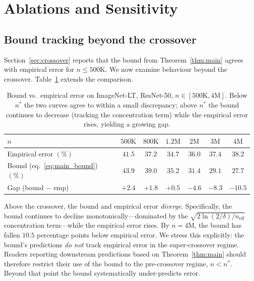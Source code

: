 \documentclass[11pt]{article}
\begin{document}
\section{Ablations and Sensitivity} \label{sec:ablation}

\subsection{Bound tracking beyond the crossover}

Section~\ref{sec:crossover} reports that the bound from Theorem~\ref{thm:main} agrees with empirical error for $n \le 500\text{K}$. We now examine behaviour beyond the crossover. Table~\ref{tab:bound_vs_emp} extends the comparison.

\begin{table}[h]
\centering
\caption{Bound vs.\ empirical error on ImageNet-LT, ResNet-50, $n \in [500\text{K}, 4\text{M}]$. Below $n^{*}$ the two curves agree to within a small discrepancy; above $n^{*}$ the bound continues to decrease (tracking the concentration term) while the empirical error rises, yielding a growing gap.}
\label{tab:bound_vs_emp}
\begin{tabular}{lcccccc}
\toprule
$n$ & $500\text{K}$ & $800\text{K}$ & $1.2\text{M}$ & $2\text{M}$ & $3\text{M}$ & $4\text{M}$ \\
\midrule
Empirical error $(\%)$ & $41.5$ & $37.2$ & $34.7$ & $36.0$ & $37.4$ & $38.2$ \\
Bound (eq.~\ref{eq:main_bound}) $(\%)$ & $43.9$ & $39.0$ & $35.2$ & $31.4$ & $29.1$ & $27.7$ \\
Gap (bound $-$ emp) & $+2.4$ & $+1.8$ & $+0.5$ & $-4.6$ & $-8.3$ & $-10.5$ \\
\bottomrule
\end{tabular}
\end{table}

Above the crossover, the bound and empirical error \emph{diverge}. Specifically, the bound continues to decline monotonically---dominated by the $\sqrt{2 \ln(2/\delta) / n_{\mathrm{eff}}}$ concentration term---while the empirical error rises. By $n = 4\text{M}$, the bound has fallen $10.5$ percentage points below empirical error. We stress this explicitly: the bound's predictions \emph{do not} track empirical error in the super-crossover regime. Readers reporting downstream predictions based on Theorem~\ref{thm:main} should therefore restrict their use of the bound to the pre-crossover regime, $n < n^{*}$. Beyond that point the bound systematically under-predicts error.
\end{document}
